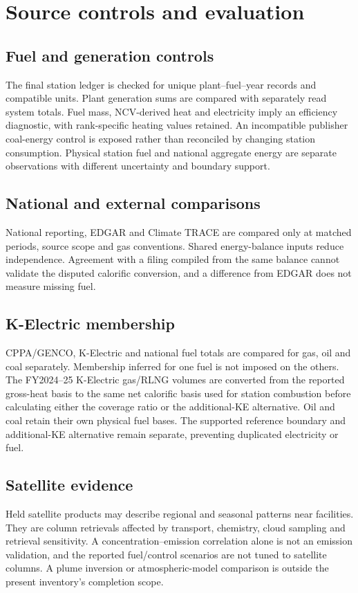 \section{Source controls and evaluation}
\label{sec:validation}
\subsection{Fuel and generation controls}\label{sec:heatrate}\label{sec:impliedcv}
The final station ledger is checked for unique plant--fuel--year records and compatible units. Plant generation sums are compared with separately read system totals. Fuel mass, NCV-derived heat and electricity imply an efficiency diagnostic, with rank-specific heating values retained. An incompatible publisher coal-energy control is exposed rather than reconciled by changing station consumption. Physical station fuel and national aggregate energy are separate observations with different uncertainty and boundary support.

\subsection{National and external comparisons}\label{sec:crt}\label{sec:trace}
National reporting, EDGAR and Climate TRACE are compared only at matched periods, source scope and gas conventions. Shared energy-balance inputs reduce independence. Agreement with a filing compiled from the same balance cannot validate the disputed calorific conversion, and a difference from EDGAR does not measure missing fuel.

\subsection{K-Electric membership}\label{sec:keleg}
CPPA/GENCO, K-Electric and national fuel totals are compared for gas, oil and coal separately. Membership inferred for one fuel is not imposed on the others. The FY2024--25 K-Electric gas/RLNG volumes are converted from the reported gross-heat basis to the same net calorific basis used for station combustion before calculating either the coverage ratio or the additional-KE alternative. Oil and coal retain their own physical fuel bases. The supported reference boundary and additional-KE alternative remain separate, preventing duplicated electricity or fuel.

\subsection{Satellite evidence}\label{sec:tropomi}
Held satellite products may describe regional and seasonal patterns near facilities. They are column retrievals affected by transport, chemistry, cloud sampling and retrieval sensitivity. A concentration--emission correlation alone is not an emission validation, and the reported fuel/control scenarios are not tuned to satellite columns. A plume inversion or atmospheric-model comparison is outside the present inventory's completion scope.
